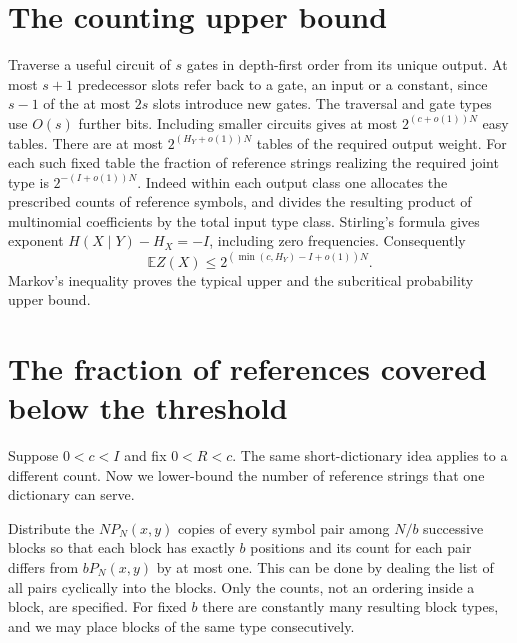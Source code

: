 \documentclass[11pt]{article}
\begin{document}
\section{The counting upper bound}
Traverse a useful circuit of $s$ gates in depth-first order from its unique output. At most $s+1$ predecessor slots refer back to a gate, an input or a constant, since $s-1$ of the at most $2s$ slots introduce new gates. The traversal and gate types use $O(s)$ further bits. Including smaller circuits gives at most $2^{(c+o(1))N}$ easy tables. There are at most $2^{(H_Y+o(1))N}$ tables of the required output weight. For each such fixed table the fraction of reference strings realizing the required joint type is $2^{-(I+o(1))N}$. Indeed within each output class one allocates the prescribed counts of reference symbols, and divides the resulting product of multinomial coefficients by the total input type class. Stirling's formula gives exponent $H(X\mid Y)-H_X=-I$, including zero frequencies. Consequently
\[
                \mathbb E Z(X)\le 2^{(\min(c,H_Y)-I+o(1))N}.
\]
Markov's inequality proves the typical upper and the subcritical probability upper bound.



\section{The fraction of references covered below the threshold}
Suppose $0<c<I$ and fix $0<R<c$. The same short-dictionary idea applies to a different count. Now we lower-bound the number of reference strings that one dictionary can serve.

Distribute the $N P_N(x,y)$ copies of every symbol pair among $N/b$ successive blocks so that each block has exactly $b$ positions and its count for each pair differs from $bP_N(x,y)$ by at most one. This can be done by dealing the list of all pairs cyclically into the blocks. Only the counts, not an ordering inside a block, are specified. For fixed $b$ there are constantly many resulting block types, and we may place blocks of the same type consecutively.
\end{document}
